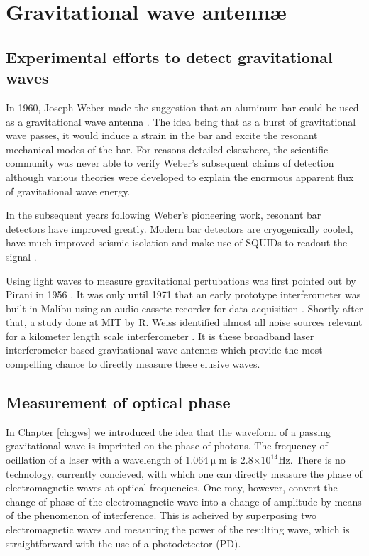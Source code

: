 \chapter{Gravitational wave antenn\ae{}}

\section{Experimental efforts to detect gravitational waves}
In 1960, Joseph Weber made the suggestion that an aluminum bar could be used as a gravitational wave antenna \cite{bar1}. %
The idea being that as a burst of gravitational wave passes, it would induce a strain in the bar and excite the resonant mechanical modes of the bar. %
For reasons detailed elsewhere\cite{bar2,bar3}, the scientific community was never able to verify Weber’s subsequent claims of detection\cite{bar4} although various theories\cite{bar5,bar6} were developed to explain the enormous apparent flux of gravitational wave energy.

In the subsequent years following Weber’s pioneering work, resonant bar detectors have improved greatly. %
Modern bar detectors are cryogenically cooled, have much improved seismic isolation and make use of SQUIDs to readout the signal \cite{bar7}.

Using light waves to measure gravitational pertubations was first pointed out by Pirani in 1956 \cite{ifo1}. %
It was only until 1971 that an early prototype interferometer was built in Malibu using an audio cassete recorder for data acquisition \cite{ifo2}. %
Shortly after that, a study done at MIT by R. %
Weiss identified almost all noise sources relevant for a kilometer length scale interferometer \cite{ifo3}. %
It is these broadband laser interferometer based gravitational wave antenn\ae{} which provide the most compelling chance to directly measure these elusive waves.

\section{Measurement of optical phase}
In Chapter \ref{ch:gws} we introduced the idea that the waveform of a passing gravitational wave is imprinted on the phase of photons. %
The frequency of ocillation of a laser with a wavelength of 1.064$\upmu$m is 2.8$\times 10^{14}$Hz. %
There is no technology, currently concieved, with which one can directly measure the phase of electromagnetic waves at optical frequencies. %
One may, however, convert the change of phase of the electromagnetic wave into a change of amplitude by means of the phenomenon of interference. %
This is acheived by superposing two electromagnetic waves and measuring the power of the resulting wave, which is straightforward with the use of a photodetector (PD). %



